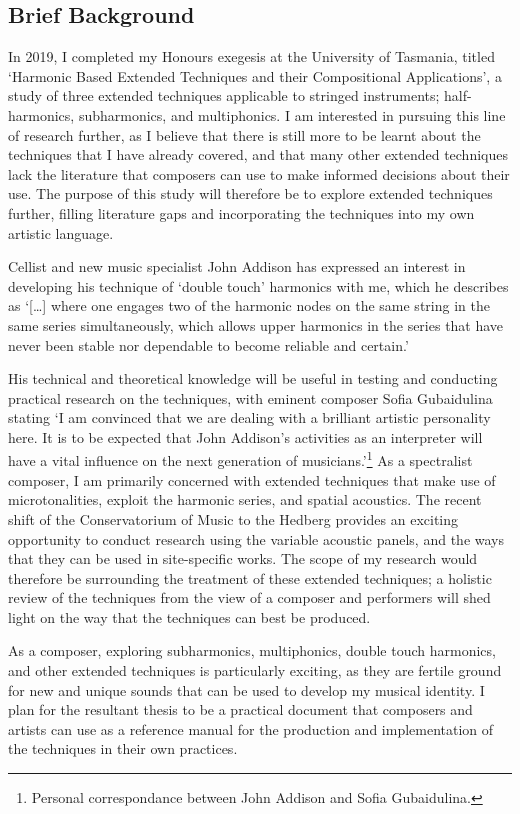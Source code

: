 \subsection{Brief Background}
In 2019, I completed my Honours exegesis at the University of Tasmania, titled `Harmonic Based Extended Techniques and their Compositional Applications', a study of three extended techniques applicable to stringed instruments; half-harmonics, subharmonics, and multiphonics.
I am interested in pursuing this line of research further, as I believe that there is still more to be learnt about the techniques that I have already covered, and that many other extended techniques lack the literature that composers can use to make informed decisions about their use. 
The purpose of this study will therefore be to explore extended techniques further, filling literature gaps and incorporating the techniques into my own artistic language.

Cellist and new music specialist John Addison has expressed an interest in developing his technique of `double touch' harmonics with me, which he describes as `[\ldots] where one engages two of the harmonic nodes on the same string in the same series simultaneously, which allows upper harmonics in the series that have never been stable nor dependable to become reliable and certain.'


His technical and theoretical knowledge will be useful in testing and conducting practical research on the techniques, with eminent composer Sofia Gubaidulina stating 
    `I am convinced that we are dealing with a brilliant artistic personality here. 
    It is to be expected that John Addison’s activities as an interpreter will have a vital influence on the next generation of musicians.'\footnote{Personal correspondance between John Addison and Sofia Gubaidulina.}
As a spectralist composer, I am primarily concerned with extended techniques that make use of microtonalities, exploit the harmonic series, and spatial acoustics.
The recent shift of the Conservatorium of Music to the Hedberg provides an exciting opportunity to conduct research using the variable acoustic panels, and the ways that they can be used in site-specific works. 
The scope of my research would therefore be surrounding the treatment of these extended techniques; a holistic review of the techniques from the view of a composer and performers will shed light on the way that the techniques can best be produced.

As a composer, exploring subharmonics, multiphonics, double touch harmonics, and other extended techniques is particularly exciting, as they are fertile ground for new and unique sounds that can be used to develop my musical identity.
I plan for the resultant thesis to be a practical document that composers and artists can use as a reference manual for the production and implementation of the techniques in their own practices.

